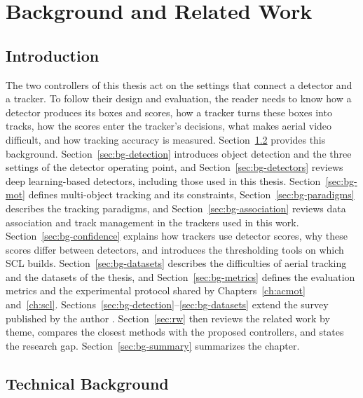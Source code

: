 \chapter{Background and Related Work}\label{ch:background}

\section{Introduction}\label{sec:bg-intro}
The two controllers of this thesis act on the settings that connect a detector and a tracker. To follow their design and evaluation, the reader needs to know how a detector produces its boxes and scores, how a tracker turns these boxes into tracks, how the scores enter the tracker's decisions, what makes aerial video difficult, and how tracking accuracy is measured. Section~\ref{sec:bg-technical} provides this background. Section~\ref{sec:bg-detection} introduces object detection and the three settings of the detector operating point, and Section~\ref{sec:bg-detectors} reviews deep learning-based detectors, including those used in this thesis. Section~\ref{sec:bg-mot} defines multi-object tracking and its constraints, Section~\ref{sec:bg-paradigms} describes the tracking paradigms, and Section~\ref{sec:bg-association} reviews data association and track management in the trackers used in this work. Section~\ref{sec:bg-confidence} explains how trackers use detector scores, why these scores differ between detectors, and introduces the thresholding tools on which SCL builds. Section~\ref{sec:bg-datasets} describes the difficulties of aerial tracking and the datasets of the thesis, and Section~\ref{sec:bg-metrics} defines the evaluation metrics and the experimental protocol shared by Chapters~\ref{ch:acmot} and~\ref{ch:scl}. Sections~\ref{sec:bg-detection}--\ref{sec:bg-datasets} extend the survey published by the author \cite{ismail2026realtime}. Section~\ref{sec:rw} then reviews the related work by theme, compares the closest methods with the proposed controllers, and states the research gap. Section~\ref{sec:bg-summary} summarizes the chapter.

\section{Technical Background}\label{sec:bg-technical}

